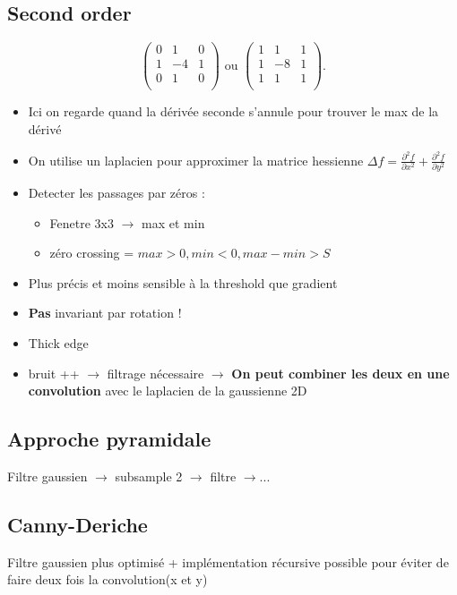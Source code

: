 \documentclass{article}
\theoremstyle{plain}%
\theoremstyle{definition}
\theoremstyle{remark}
\begin{document}
\subsection{Second order}

\[
    \begin{pmatrix}
        0 & 1 & 0 \\
        1 & -4 & 1 \\
        0 & 1 & 0 \\
    \end{pmatrix} \text{ ou } \begin{pmatrix}
        1 & 1 & 1 \\
        1 & -8 & 1 \\
        1 & 1 & 1 \\
    \end{pmatrix}
.\]
\begin{itemize}
    \item Ici on regarde quand la dérivée seconde s'annule pour trouver le max de la dérivé
    \item On utilise un laplacien pour approximer la matrice hessienne $ \Delta f = \frac{\partial ^2 f}{\partial x^2} + \frac{\partial ^2f}{\partial y^2} $ 
    \item Detecter les passages par zéros : \begin{itemize}
        \item Fenetre 3x3 $\rightarrow$ max et min
        \item zéro crossing = $max > 0, min < 0, max - min > S$
    \end{itemize}
    \item Plus précis et moins sensible à la threshold que gradient
    \item \textbf{Pas} invariant par rotation ! 
    \item Thick edge
    \item bruit ++ $\rightarrow$ filtrage nécessaire $\rightarrow$ \textbf{On peut combiner les deux en une convolution} avec le laplacien de la gaussienne 2D
\end{itemize}

\subsection{Approche pyramidale}
Filtre gaussien $\rightarrow$ subsample 2 $\rightarrow$ filtre $\rightarrow$...

\subsection{Canny-Deriche}
Filtre gaussien plus optimisé + implémentation récursive possible pour éviter de faire deux fois la convolution(x et y)
\end{document}

